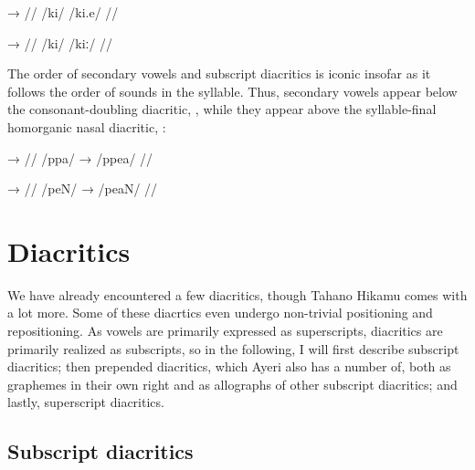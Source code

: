 \pex[lingstyle=thex]
\a\label{ex:kie}\begingl
	\gla {}	→	 //
	\glb /ki/	{}	/ki.e/ //
\endgl

\a\label{ex:kii}\begingl
	\gla {}	→	 //
	\glb /ki/	{}	/kiː/ //
\endgl

\xe

The order of secondary vowels and subscript diacritics is iconic insofar as 
it follows the order of sounds in the syllable. Thus, secondary vowels appear 
below the consonant-doubling diacritic, , while they appear above the 
syllable-final homorganic nasal diacritic, :

\pex[lingstyle=thex]\label{ex:subscrord}
\a\begingl
	\gla {}	→	 //
	\glb /ppa/	→	/ppea/ //
\endgl

\a\begingl
	\gla {}	→	 //
	\glb /peN/	→	/peaN/ //
\endgl
\xe


\section{Diacritics}

We have already encountered a few diacritics, though Tahano Hikamu comes with a
lot more. Some of these diacrtics even undergo non-trivial positioning and
repositioning. As vowels are primarily expressed as superscripts, diacritics
are primarily realized as subscripts, so in the following, I will first
describe subscript diacritics; then prepended diacritics, which Ayeri also has
a number of, both as graphemes in their own right and as allographs of other
subscript diacritics; and lastly, superscript diacritics.

\subsection{Subscript diacritics}


